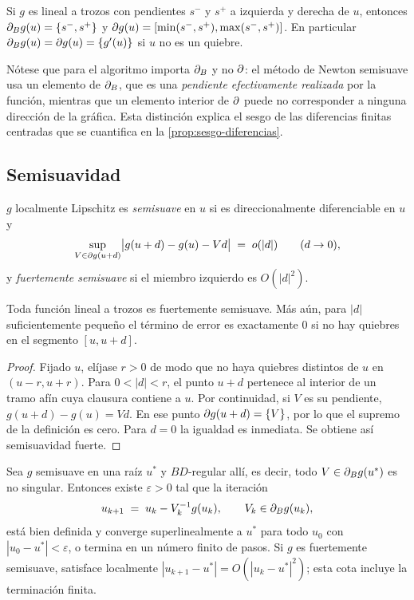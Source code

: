 \begin{lemma}
\label{lem:subdif-pl}
Si $g$ es lineal a trozos con pendientes $s^-$ y $s^+$ a izquierda y derecha de
$u$, entonces $\partial_B g(u)=\{s^-,s^+\}$ y $\partial g(u)=[\min(s^-,s^+),\max(s^-,s^+)]$.
En particular $\partial_B g(u)=\partial g(u)=\{g'(u)\}$ si $u$ no es un quiebre.
\end{lemma}

Nótese que para el algoritmo importa $\partial_B$ y no $\partial$: el método de Newton
semisuave usa un elemento de $\partial_B$, que es una \emph{pendiente efectivamente
realizada} por la función, mientras que un elemento interior de $\partial$ puede no
corresponder a ninguna dirección de la gráfica. Esta distinción explica el sesgo
de las diferencias finitas centradas que se cuantifica en la
\cref{prop:sesgo-diferencias}.

\subsection{Semisuavidad}

\begin{definition}
$g$ localmente Lipschitz es \emph{semisuave} en $u$ si es direccionalmente
diferenciable en $u$ y
\[
  \sup_{V\in\partial g(u+d)} \bigl| g(u+d)-g(u)-V d \bigr| \;=\; o(|d|)
  \qquad (d\to0),
\]
y \emph{fuertemente semisuave} si el miembro izquierdo es $O(|d|^2)$.
\end{definition}

\begin{lemma}
\label{lem:pl-semisuave}
Toda función lineal a trozos es fuertemente semisuave. Más aún, para $|d|$
suficientemente pequeño el término de error es exactamente $0$ si no hay quiebres
en el segmento $[u,u+d]$.
\end{lemma}
\begin{proof}
Fijado $u$, elíjase $r>0$ de modo que no haya quiebres distintos de $u$
en $(u-r,u+r)$. Para $0<|d|<r$, el punto $u+d$ pertenece al interior
de un tramo afín cuya clausura contiene a $u$. Por continuidad, si $V$
es su pendiente, $g(u+d)-g(u)=Vd$. En ese punto
$\partial g(u+d)=\{V\}$, por lo que el supremo de la definición es cero.
Para $d=0$ la igualdad es inmediata. Se obtiene así semisuavidad fuerte.
\end{proof}

\begin{theorem}
\label{thm:qi-sun}
Sea $g$ semisuave en una raíz $u^*$ y $BD$-regular allí, es decir, todo
$V\in\partial_B g(u^*)$ es no singular. Entonces existe $\varepsilon>0$ tal que la
iteración
\[
  u_{k+1}\;=\;u_k - V_k^{-1}g(u_k),\qquad V_k\in\partial_B g(u_k),
\]
está bien definida y converge superlinealmente a $u^*$ para todo
$u_0$ con $|u_0-u^*|<\varepsilon$, o termina en un número finito de pasos.
Si $g$ es fuertemente semisuave, satisface localmente
$|u_{k+1}-u^*|=O(|u_k-u^*|^2)$; esta cota incluye la terminación finita.
\end{theorem}

